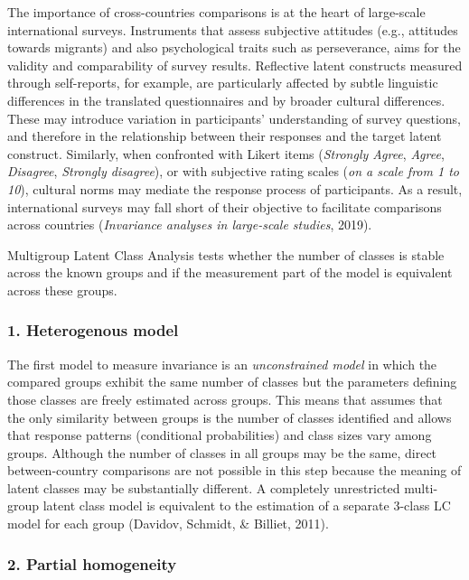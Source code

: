 \documentclass[12pt,a4paper,oneside]{reedthesis}
\begin{document}
The importance of cross-countries comparisons is at the heart of large-scale international surveys. Instruments that assess subjective attitudes (e.g., attitudes towards migrants) and also psychological traits such as perseverance, aims for the validity and comparability of survey results. Reflective latent constructs measured through self-reports, for example, are particularly affected by subtle linguistic differences in the translated questionnaires and by broader cultural differences. These may introduce variation in participants' understanding of survey questions, and therefore in the relationship between their responses and the target latent construct. Similarly, when confronted with Likert items (\emph{Strongly Agree}, \emph{Agree}, \emph{Disagree}, \emph{Strongly disagree}), or with subjective rating scales (\emph{on a scale from 1 to 10}), cultural norms may mediate the response process of participants. As a result, international surveys may fall short of their objective to facilitate comparisons across countries (\emph{Invariance analyses in large-scale studies}, 2019).

Multigroup Latent Class Analysis tests whether the number of classes is stable across the known groups and if the measurement part of the model is equivalent across these groups.

\hypertarget{heterogenous-model}{%
\subsubsection{1. Heterogenous model}\label{heterogenous-model}}

The first model to measure invariance is an \emph{unconstrained model} in which the compared groups exhibit the same number of classes but the parameters defining those classes are freely estimated across groups. This means that assumes that the only similarity between groups is the number of classes identified and allows that response patterns (conditional probabilities) and class sizes vary among groups. Although the number of classes in all groups may be the same, direct between-country comparisons are not possible in this step because the meaning of latent classes may be substantially different. A completely unrestricted multi-group latent class model is equivalent to the estimation of a separate 3-class LC model for each group (Davidov, Schmidt, \& Billiet, 2011).

\hypertarget{partial-homogeneity}{%
\subsubsection{2. Partial homogeneity}\label{partial-homogeneity}}
\end{document}
